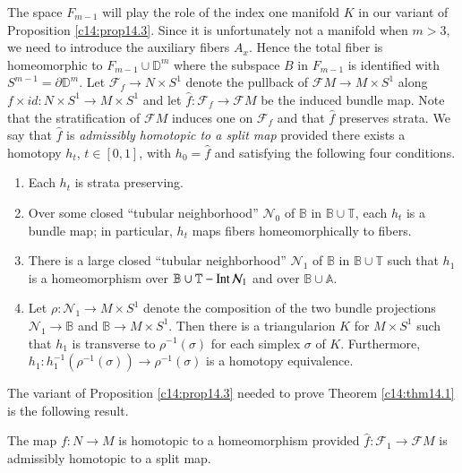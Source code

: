 The space $F_{m-1}$ will play the role of the index one manifold $K$
in our variant of Proposition \ref{c14:prop14.3}. Since it is
unfortunately not a manifold when $m > 3$, we need to introduce the
auxiliary fibers $A_x$. Hence the total fiber is homeomorphic to
$F_{m-1} \cup \mathbb{D}^m$ where the subspace $B$ in $F_{m-1}$ is
identified with $S^{m-1}= \partial \mathbb{D}^m$. Let $\mathcal{F}_f
\to N \times S^1$ denote the pullback of $\mathcal{F} M \to M \times
S^1$ along $f \times id: N \times S^1 \to M \times S^1$ and let
$\hat{f} : \mathcal{F}_f \to \mathcal{F}M$ be the\pageoriginale
induced bundle map. Note that the stratification of $\mathcal{F}M$
induces one on $\mathcal{F}_f$ and that $\hat{f}$ preserves strata. We
say that $\hat{f}$ is \textit{admissibly homotopic to a split map}
provided there exists a homotopy $h_t$, $t \in [0, 1]$, with $h_0=
\hat{f}$ and satisfying the following four conditions.
\begin{enumerate}
\item Each $h_t$ is strata preserving.
\item Over some closed ``tubular neighborhood'' $\mathcal{N}_0$ of
  $\mathbb{B}$ in $\mathbb{B} \cup \mathbb{T}$, each $h_t$ is a
  bundle map; in particular, $h_t$ maps fibers homeomorphically to
  fibers.
  \item There is a large closed ``tubular neighborhood''
    $\mathcal{N}_1$ of $\mathbb{B}$ in $\mathbb{B} \cup \mathbb{T}$
    such that $h_1$ is a homeomorphism over $\mathbb{B} \cup
    \mathbb{T}- \operatorname{Int} \mathcal{N}_1$ and over $\mathbb{B} \cup
    \mathbb{A}$.
    \item Let $\rho : \mathcal{N}_1 \to M \times S^1$ denote the
      composition of the two bundle projections $\mathcal{N}_1 \to
      \mathbb{B}$ and $\mathbb{B} \to M \times S^1$. Then there is a
      triangularion $K$ for $M \times S^1$ such that $h_1$ is
      transverse to $\rho^{-1} (\sigma)$ for each simplex $\sigma$ of
      $K$. Furthermore, $h_1: h_1^{-1} (\rho^{-1} (\sigma)) \to
      \rho^{-1} (\sigma)$ is a homotopy equivalence.
\end{enumerate}

The variant of  Proposition \ref{c14:prop14.3} needed to prove Theorem
\ref{c14:thm14.1} is the following result.

\begin{prop}\label{c14:prop14.6}
  The map $f : N \to M$ is homotopic to a homeomorphism provided
  $\hat{f} : \mathcal{F}_1 \to \mathcal{F} M$ is admissibly homotopic
  to a split map.
\end{prop}

